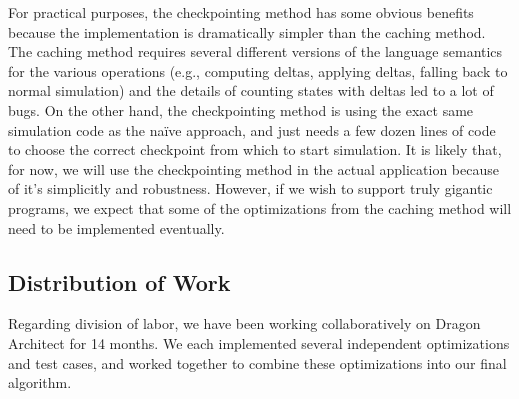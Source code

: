 \documentclass{sig-alternate}
\begin{document}
For practical purposes, the checkpointing method has some obvious benefits because the implementation is dramatically simpler than the caching method. The caching method requires several different versions of the language semantics for the various operations (e.g., computing deltas, applying deltas, falling back to normal simulation) and the details of counting states with deltas led to a lot of bugs. On the other hand, the checkpointing method is using the exact same simulation code as the na\"{i}ve approach, and just needs a few dozen lines of code to choose the correct checkpoint from which to start simulation. It is likely that, for now, we will use the checkpointing method in the actual application because of it's simplicitly and robustness. However, if we wish to support truly gigantic programs, we expect that some of the optimizations from the caching method will need to be implemented eventually.

\subsection{Distribution of Work}
Regarding division of labor, we have been working collaboratively on Dragon Architect for 14 months. We each implemented several independent optimizations and test cases, and worked together to combine these optimizations into our final algorithm.




\appendix
\end{document}
